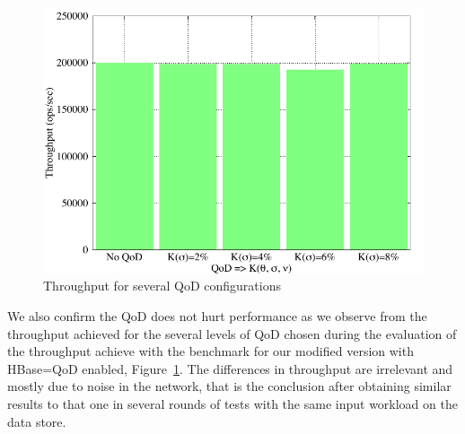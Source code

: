
\begin{figure}[h]
\centering
\includegraphics[width=0.8\linewidth]{figs/throughput.pdf}
\caption{Throughput for several QoD configurations}
\label{fig-throughput}
\end{figure}
We also confirm the QoD does not hurt performance as we observe from the throughput achieved for the several levels of QoD chosen during the evaluation of the throughput achieve with the benchmark for our modified version with HBase=QoD enabled, Figure~\ref{fig-throughput}. The differences in throughput are irrelevant and mostly due to noise in the network, that is the conclusion after obtaining similar results to that one in several rounds of tests with the same input workload on the data store.


